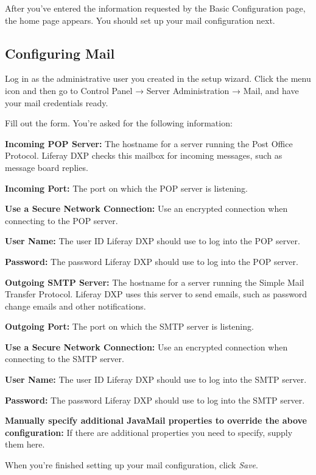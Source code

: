 \noindent\hrulefill

After you've entered the information requested by the Basic
Configuration page, the home page appears. You should set up your mail
configuration next.

\subsection{Configuring Mail}\label{configuring-mail}

Log in as the administrative user you created in the setup wizard. Click
the menu icon and then go to Control Panel → Server Administration →
Mail, and have your mail credentials ready.

Fill out the form. You're asked for the following information:

\textbf{Incoming POP Server:} The hostname for a server running the Post
Office Protocol. Liferay DXP checks this mailbox for incoming messages,
such as message board replies.

\textbf{Incoming Port:} The port on which the POP server is listening.

\textbf{Use a Secure Network Connection:} Use an encrypted connection
when connecting to the POP server.

\textbf{User Name:} The user ID Liferay DXP should use to log into the
POP server.

\textbf{Password:} The password Liferay DXP should use to log into the
POP server.

\textbf{Outgoing SMTP Server:} The hostname for a server running the
Simple Mail Transfer Protocol. Liferay DXP uses this server to send
emails, such as password change emails and other notifications.

\textbf{Outgoing Port:} The port on which the SMTP server is listening.

\textbf{Use a Secure Network Connection:} Use an encrypted connection
when connecting to the SMTP server.

\textbf{User Name:} The user ID Liferay DXP should use to log into the
SMTP server.

\textbf{Password:} The password Liferay DXP should use to log into the
SMTP server.

\textbf{Manually specify additional JavaMail properties to override the
above configuration:} If there are additional properties you need to
specify, supply them here.

When you're finished setting up your mail configuration, click
\emph{Save}.

